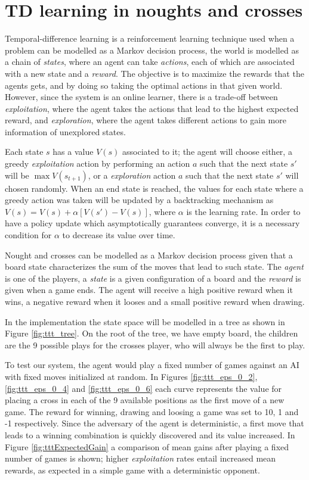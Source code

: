 \documentclass[12pt]{article}
\begin{document}
\section{TD learning in noughts and crosses}
\label{sec:td_ttt}

Temporal-difference learning\cite{Sutton1998} is a reinforcement learning technique used when a problem can be modelled as a Markov decision process, the world is modelled as a chain of \emph{states}, where an agent can take \emph{actions}, each of which are associated with a new state and a \emph{reward}.
The objective is to maximize the rewards that the agents gets, and by doing so taking the optimal actions in that given world.
However, since the system is an online learner, there is a trade-off between \emph{exploitation}, where the agent takes the actions that lead to the highest expected reward, and \emph{exploration}, where the agent takes different actions to gain more information of unexplored states.

Each state $s$ has a value $V(s)$ associated to it; the agent will choose either, a greedy \emph{exploitation} action by performing an action $a$ such that the next state $s'$  will be $\max V(s_{t + 1})$, or a \emph{exploration} action $a$ such that the next state $s'$  will chosen randomly.
When an end state is reached, the values for each state where a greedy action was taken will be updated by a backtracking mechanism as $V(s) = V(s) + \alpha \left[ V(s') - V(s) \right]$, where $\alpha$ is the learning rate.
In order to have a policy update which asymptotically guarantees converge, it is a necessary condition for $\alpha$ to decrease its value over time.

Nought and crosses can be modelled as a Markov decision process given that a board state characterizes the sum of the moves that lead to such state.
The \emph{agent} is one of the players, a \emph{state} is a given configuration of a board and the \emph{reward} is given when a game ends.
The agent will receive a high positive reward when it wins, a negative reward when it looses and a small positive reward when drawing.

In the implementation the state space will be modelled in a tree as shown in Figure \ref{fig:ttt_tree}.
On the root of the tree, we have empty board, the children are the 9 possible plays for the crosses player, who will always be the first to play.

To test our system, the agent would play a fixed number of games against an AI with fixed moves initialized at random.
In Figures \ref{fig:ttt_eps_0_2}, \ref{fig:ttt_eps_0_4} and \ref{fig:ttt_eps_0_6} each curve represents the value for placing a cross in each of the 9 available positions as the first move of a new game.
The reward for winning, drawing and loosing a game was set to 10, 1 and -1 respectively.
Since the adversary of the agent is deterministic, a first move that leads to a winning combination is quickly discovered and its value increased. 
In Figure \ref{fig:tttExpectedGain} a comparison of mean gains after playing a fixed number of games is shown; higher \emph{exploitation} rates entail increased mean rewards, as expected in a simple game with a deterministic opponent.
\end{document}
